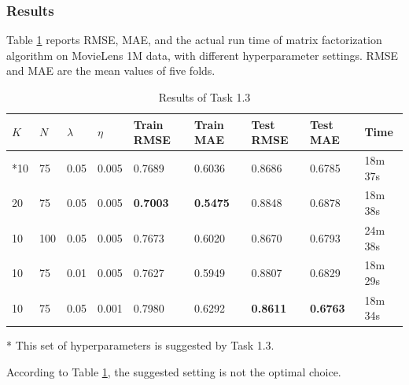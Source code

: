\documentclass{article}
\begin{document}
\subsubsection{Results}
Table \ref{tab:1.3-results} reports RMSE, MAE, and the actual run time of matrix factorization algorithm on MovieLens 1M data, with different hyperparameter settings. RMSE and MAE are the mean values of five folds.
\begin{table}[ht]
    \centering
    \caption{Results of Task 1.3}
    \label{tab:1.3-results}
    \begin{threeparttable}
    \begin{tabular}{lllllllll}
        \toprule
        \textbf{$K$} & \textbf{$N$} & \textbf{$\lambda$} & \textbf{$\eta$} & \textbf{Train RMSE} & \textbf{Train MAE} & \textbf{Test RMSE} & \textbf{Test MAE} & \textbf{Time}\\
        \midrule
        *10 & 75 & 0.05 & 0.005 & 0.7689 & 0.6036 & 0.8686 & 0.6785 & 18m 37s\\
        20 & 75 & 0.05 & 0.005 & \textbf{0.7003} & \textbf{0.5475} & 0.8848 & 0.6878 & 18m 38s\\
        10 & 100 & 0.05 & 0.005 & 0.7673 & 0.6020 & 0.8670 & 0.6793 & 24m 38s\\
        10 & 75 & 0.01 & 0.005 & 0.7627 & 0.5949 & 0.8807 & 0.6829 & 18m 29s\\
        10 & 75 & 0.05 & 0.001 & 0.7980 & 0.6292 & \textbf{0.8611} & \textbf{0.6763} & 18m 34s\\
        \bottomrule
    \end{tabular}
    \begin{tablenotes}
        \footnotesize
        \item[*] This set of hyperparameters is suggested by Task 1.3.
    \end{tablenotes}
    \end{threeparttable}
\end{table}
\par
According to Table \ref{tab:1.3-results}, the suggested setting is not the optimal choice.
\end{document}
